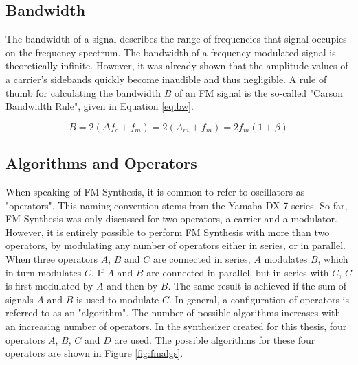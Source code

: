 \documentclass[12pt,twoside]{report}
\begin{document}
\subsection{Bandwidth}

The bandwidth of a signal describes the range of frequencies that signal occupies on the frequency spectrum. The bandwidth of a frequency-modulated signal is theoretically infinite. However, it was already shown that the amplitude values of a carrier's sidebands quickly become inaudible and thus negligible. A rule of thumb for calculating the bandwidth $B$ of an FM signal is the so-called "Carson Bandwidth Rule", given in Equation \ref{eq:bw}.

\begin{equation}
  B = 2(\Delta f_{c} + f_{m}) = 2(A_{m} + f_{m}) = 2f_{m}(1 + \beta)
  \label{eq:bw}
\end{equation}

\subsection{Algorithms and Operators}

When speaking of FM Synthesis, it is common to refer to oscillators as "operators". This naming convention stems from the Yamaha DX-7 series. So far, FM Synthesis was only discussed for two operators, a carrier and a modulator. However, it is entirely possible to perform FM Synthesis with more than two operators, by modulating any number of operators either in series, or in parallel. When three operators $A$, $B$ and $C$ are connected in series, $A$ modulates $B$, which in turn modulates $C$. If $A$ and $B$ are connected in parallel, but in series with $C$, $C$ is first modulated by $A$ and then by $B$. The same result is achieved if the sum of signals $A$ and $B$ is used to modulate $C$. In general, a configuration of operators is referred to as an "algorithm". The number of possible algorithms increases with an increasing number of operators. In the synthesizer created for this thesis, four operators $A$, $B$, $C$ and $D$ are used. The possible algorithms for these four operators are shown in Figure \ref{fig:fmalgs}.
\end{document}
